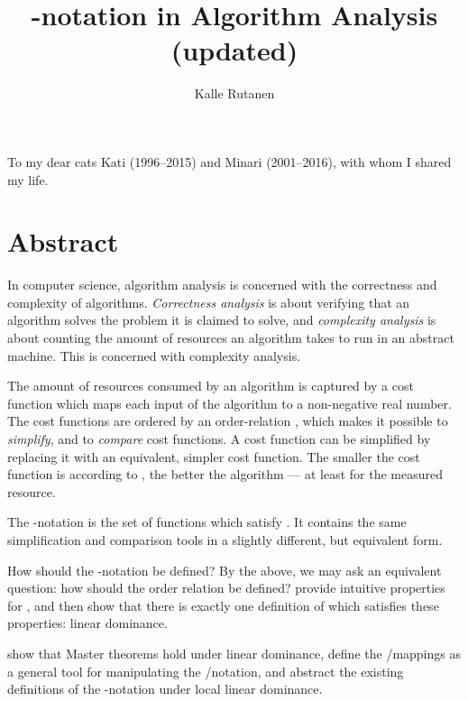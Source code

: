 \documentclass[b5paper, english, oneside]{memoir}
\title{\texorpdfstring{}{O}-notation in Algorithm Analysis \\ (updated)}
\author{Kalle Rutanen}
\begin{document}
\frontmatter

\ifthesis

\else
\maketitle
\fi

\newpage
\thispagestyle{empty}
\vspace*{.35\textheight}
\begin{center}To my dear cats Kati (1996--2015) and Minari (2001--2016), \newline with whom I shared my life.
\end{center}

\chapter{Abstract}
\setcounter{page}{1}

In computer science, algorithm analysis is concerned with the correctness and complexity of algorithms. \emph{Correctness analysis} is about verifying that an algorithm solves the problem it is claimed to solve, and \emph{complexity analysis} is about counting the amount of resources an algorithm takes to run in an abstract machine. This \manuscript{} is concerned with complexity analysis. 

The amount of resources consumed by an algorithm is captured by a cost function which maps each input of the algorithm to a non-negative real number. The cost functions are ordered by an order-relation , which makes it possible to \emph{simplify}, and to \emph{compare} cost functions. A cost function can be simplified by replacing it with an equivalent, simpler cost function. The smaller the cost function is according to , the better the algorithm --- at least for the measured resource.  

The -notation  is the set of functions  which satisfy . It contains the same simplification and comparison tools in a slightly different, but equivalent form. 

How should the -notation be defined? By the above, we may ask an equivalent question: how should the order relation  be defined? \We{} provide \nprim{} intuitive properties for , and then show that there is exactly one definition of  which satisfies these properties: linear dominance. 

\We{} show that Master theorems hold under linear dominance, define the \-/mappings as a general tool for manipulating the \-/notation, and abstract the existing definitions of the -notation under local linear dominance.
\end{document}
